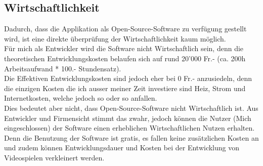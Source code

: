 \subsection{Wirtschaftlichkeit}
Dadurch, dass die Applikation als Open-Source-Software zu verfügung gestellt wird,
ist eine direkte überprüfung der Wirtschaftlichkeit kaum möglich.\\
Für mich als Entwickler wird die Software nicht Wirtschaftlich sein, 
denn die theoretischen Entwicklungskosten belaufen sich auf rund 20'000 Fr.- (ca. 200h Arbeitsaufwand * 100.- Stundensatz).\\
Die Effektiven Entwicklungskosten sind jedoch eher bei 0 Fr.- anzusiedeln, denn die einzigen Kosten die ich ausser meiner Zeit investiere sind Heiz, Strom und Internetkosten, welche jedoch so oder so anfallen.
\vspace{1cm}\\
Dies bedeutet aber nicht, dass Open-Source-Software nicht Wirtschaftlich ist. Aus Entwickler und Firmensicht stimmt das zwahr,
jedoch können die Nutzer (Mich eingeschlossen) der Software einen erheblichen Wirtschaftlichen Nutzen erhalten. 
Denn die Benutzung der Software ist gratis, es fallen keine zusätzlichen Kosten an und zudem können Entwicklungsdauer und Kosten bei der Entwicklung von Videospielen verkleinert werden.